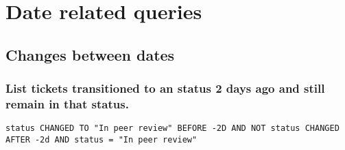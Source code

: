 \newpage
\section{Date related queries}

\subsection{Changes between dates}

\subsubsection*{List tickets transitioned to an status 2 days ago and still remain in that status.}

\begin{lstlisting}[]
    status CHANGED TO "In peer review" BEFORE -2D AND NOT status CHANGED AFTER -2d AND status = "In peer review"
\end{lstlisting}
